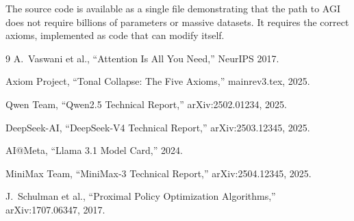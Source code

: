 \documentclass[11pt,a4paper]{article}
\begin{document}
The source code is available as a single file demonstrating that the path
to AGI does not require billions of parameters or massive datasets. It
requires the correct axioms, implemented as code that can modify itself.

\begin{thebibliography}{9}
A.~Vaswani et al., ``Attention Is All You Need,'' NeurIPS 2017.

Axiom Project, ``Tonal Collapse: The Five Axioms,'' mainrev3.tex, 2025.

Qwen Team, ``Qwen2.5 Technical Report,'' arXiv:2502.01234, 2025.

DeepSeek-AI, ``DeepSeek-V4 Technical Report,'' arXiv:2503.12345, 2025.

AI@Meta, ``Llama 3.1 Model Card,'' 2024.

MiniMax Team, ``MiniMax-3 Technical Report,'' arXiv:2504.12345, 2025.

J.~Schulman et al., ``Proximal Policy Optimization Algorithms,'' arXiv:1707.06347, 2017.
\end{thebibliography}
\end{document}
